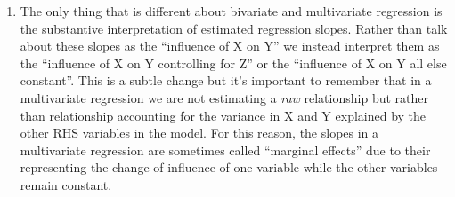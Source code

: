 \documentclass[a4paper,12pt]{article}
\begin{document}
\begin{enumerate}
\item The only thing that is different about bivariate and multivariate regression is the substantive interpretation of estimated regression slopes. Rather than talk about these slopes as the ``influence of X on Y'' we instead interpret them as the ``influence of X on Y controlling for Z'' or the ``influence of X on Y all else constant''. This is a subtle change but it's important to remember that in a multivariate regression we are not estimating a \textit{raw} relationship but rather than relationship accounting for the variance in X and Y explained by the other RHS variables in the model. For this reason, the slopes in a multivariate regression are sometimes called ``marginal effects'' due to their representing the change of influence of one variable while the other variables remain constant.

\end{enumerate}
\end{document}
